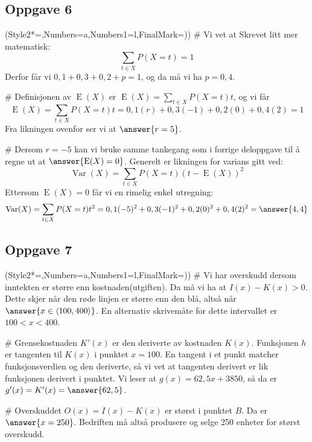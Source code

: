 \subsection*{Oppgave 6}
\begin{easylist}[enumerate]
	\ListProperties(Style2*=,Numbers=a,Numbers1=l,FinalMark={)})
	# Vi vet at  Skrevet litt mer matematisk:
	\begin{equation*}
	\sum_{t \in X}P(X = t) = 1
	\end{equation*}
	Derfor får vi $0,1 + 0,3 + 0,2 + p = 1$, og da må vi ha $p = 0,4$.
	
	# Definisjonen av $\operatorname{E}(X)$ er $\operatorname{E}(X) = \sum_{t \in X}P(X = t)t$, og vi får
	\begin{equation*}
	\operatorname{E}(X) = \sum_{t \in X}P(X = t)t =  0,1(r) + 0,3(-1) + 0,2 (0) + 0,4(2) = 1
	\end{equation*}
	Fra likningen ovenfor ser vi at $\answer{r = 5}$.
	
	# Dersom $r = -5$ kan vi bruke samme tankegang som i forrige deloppgave til å regne ut at  $\answer{\operatorname{E}(X) = 0}$. Generelt er likningen for varians gitt ved:
	\begin{equation*}
	\operatorname{Var}(X) = \sum_{t \in X}P(X = t)(t - \operatorname{E}(X))^2 
	\end{equation*}
	Ettersom $\operatorname{E}(X) = 0$ får vi en rimelig enkel utregning:
	\begin{equation*}
	\operatorname{Var}(X) = \sum_{t \in X}P(X = t)t^2 =0,1(-5)^2 + 0,3(-1)^2 + 0,2(0)^2 +0,4(2)^2 = \answer{4,4}
	\end{equation*}
\end{easylist}


\subsection*{Oppgave 7}
\begin{easylist}[enumerate]
	\ListProperties(Style2*=,Numbers=a,Numbers1=l,FinalMark={)})
	# Vi har overskudd dersom inntekten er større enn kostnaden(utgiften). 
	Da må vi ha at $I(x) - K(x) > 0$. Dette skjer når den røde linjen er større enn den blå,
	altså når $\answer{x \in \langle 100, 400 \rangle}$. 
	En alternativ skrivemåte for dette intervallet er $100 < x < 400$.
	
	# Grensekostnaden $K'(x)$ er den deriverte av kostnaden $K(x)$.
	Funksjonen $h$ er tangenten til $K(x)$ i punktet $x=100$.
	En tangent i et punkt matcher funksjonsverdien og den deriverte, så vi vet at 
	tangenten derivert er lik funksjonen derivert i punktet.
	Vi leser at $g(x) = 62,5x +3850$, så da er $g'(x) = K'(x) = \answer{62,5}$.
	
	# Overskuddet $O(x) = I(x) - K(x)$ er størst i punktet $B$. Da er $\answer{x = 250}$.
	Bedriften må altså produsere og selge 250 enheter for størst overskudd.
	
\end{easylist}


